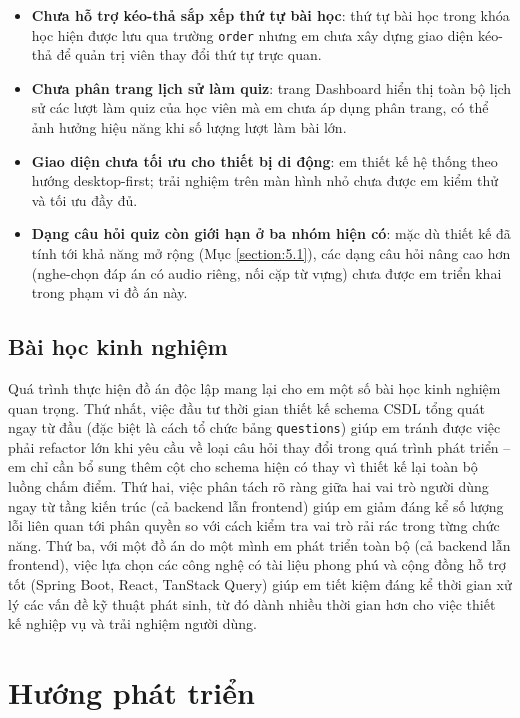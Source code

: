 \documentclass[../DoAn.tex]{subfiles}
\begin{document}
\begin{itemize}
    \item \textbf{Chưa hỗ trợ kéo-thả sắp xếp thứ tự bài học}: thứ tự bài học trong khóa học hiện được lưu qua trường \texttt{order} nhưng em chưa xây dựng giao diện kéo-thả để quản trị viên thay đổi thứ tự trực quan.
    \item \textbf{Chưa phân trang lịch sử làm quiz}: trang Dashboard hiển thị toàn bộ lịch sử các lượt làm quiz của học viên mà em chưa áp dụng phân trang, có thể ảnh hưởng hiệu năng khi số lượng lượt làm bài lớn.
    \item \textbf{Giao diện chưa tối ưu cho thiết bị di động}: em thiết kế hệ thống theo hướng desktop-first; trải nghiệm trên màn hình nhỏ chưa được em kiểm thử và tối ưu đầy đủ.
    \item \textbf{Dạng câu hỏi quiz còn giới hạn ở ba nhóm hiện có}: mặc dù thiết kế đã tính tới khả năng mở rộng (Mục \ref{section:5.1}), các dạng câu hỏi nâng cao hơn (nghe-chọn đáp án có audio riêng, nối cặp từ vựng) chưa được em triển khai trong phạm vi đồ án này.
\end{itemize}

\subsection{Bài học kinh nghiệm}

Quá trình thực hiện đồ án độc lập mang lại cho em một số bài học kinh nghiệm quan trọng. Thứ nhất, việc đầu tư thời gian thiết kế schema CSDL tổng quát ngay từ đầu (đặc biệt là cách tổ chức bảng \texttt{questions}) giúp em tránh được việc phải refactor lớn khi yêu cầu về loại câu hỏi thay đổi trong quá trình phát triển -- em chỉ cần bổ sung thêm cột cho schema hiện có thay vì thiết kế lại toàn bộ luồng chấm điểm. Thứ hai, việc phân tách rõ ràng giữa hai vai trò người dùng ngay từ tầng kiến trúc (cả backend lẫn frontend) giúp em giảm đáng kể số lượng lỗi liên quan tới phân quyền so với cách kiểm tra vai trò rải rác trong từng chức năng. Thứ ba, với một đồ án do một mình em phát triển toàn bộ (cả backend lẫn frontend), việc lựa chọn các công nghệ có tài liệu phong phú và cộng đồng hỗ trợ tốt (Spring Boot, React, TanStack Query) giúp em tiết kiệm đáng kể thời gian xử lý các vấn đề kỹ thuật phát sinh, từ đó dành nhiều thời gian hơn cho việc thiết kế nghiệp vụ và trải nghiệm người dùng.

\section{Hướng phát triển}
\label{section:6.2}
\end{document}
